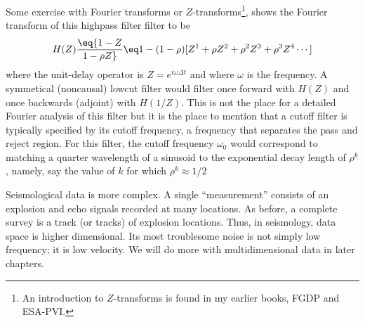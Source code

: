 \par
Some exercise with Fourier transforms
or $Z$-transforms\footnote{
        An introduction to $Z$-transforms is found in my
        earlier books, FGDP and ESA-PVI.
        },
shows the
Fourier transform of this highpass filter filter
to be
\begin{equation}
H(Z) \eq {1-Z \over 1-\rho Z}
\eq
1
-(1-\rho) [
Z^1
+\rho    Z^2
+\rho^2  Z^3
+\rho^3  Z^4
\cdots
]
\label{eqn:lowcut}
\end{equation}
where the unit-delay operator is $Z=e^{i\omega\Delta t}$
and where $\omega$ is the frequency.
A symmetical (noncausal) lowcut filter would filter once forward
with $H(Z)$ and once backwards (adjoint) with $H(1/Z)$.
This is not the place for a detailed Fourier analysis of this filter
but it is the place to mention that a cutoff filter is typically
specified by its cutoff frequency,
a frequency that separates the pass and reject region.
For this filter, the cutoff frequency $\omega_0$
would correspond to matching a quarter wavelength of a sinusoid
to the exponential decay length of $\rho^k$, namely,
say the value of $k$ for which $\rho^k \approx 1/2$

\par
Seismological data is more complex.  A single ``measurement''
consists of an explosion and echo signals recorded at many locations.
As before, a complete survey is a track (or tracks)
of explosion locations.
Thus, in seismology, data space is higher dimensional.
Its most troublesome noise is not simply low frequency;
it is low velocity.
We will do more with multidimensional data in later chapters.




